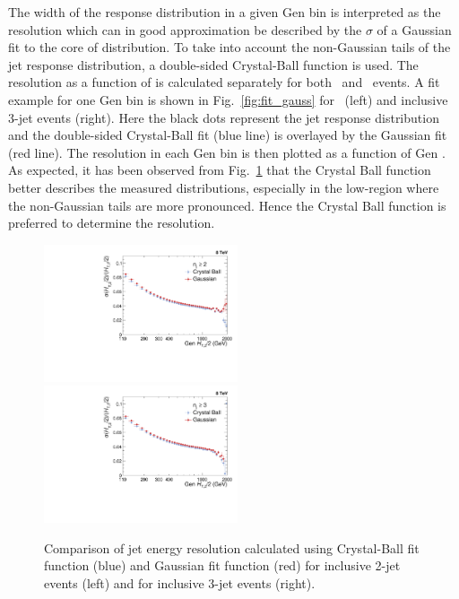 The width of the response distribution in a given Gen \httwo bin is interpreted as the resolution which can in good approximation be described by the $\sigma$ of a Gaussian fit to the core of distribution. To take into account the non-Gaussian tails of the jet response distribution, a double-sided Crystal-Ball function is used. The resolution as a function of \httwo is calculated separately for both \njt~and \njth~events. A fit example for one Gen \httwo bin is shown in Fig.~\ref{fig:fit_gauss} for \njt~(left) and inclusive 3-jet events (right). Here the black dots represent the jet response distribution and the double-sided Crystal-Ball fit (blue line) is overlayed by the Gaussian fit (red line). The resolution in each Gen \httwo bin is then plotted as a function of Gen \httwo. As expected, it has been observed from Fig.~\ref{fig:res_comp} that the Crystal Ball function better describes the measured distributions, especially in the low-\httwo region where the non-Gaussian tails are more pronounced. Hence the Crystal Ball function is preferred to determine the resolution.

\begin{figure}[h]
 \begin{center}
 \includegraphics[width=0.51\textwidth]{Plots_HT_2_150/Comparison_Resolution_Crystal_Gauss_2.pdf}%
 ~~\includegraphics[width=0.51\textwidth]{Plots_HT_2_150/Comparison_Resolution_Crystal_Gauss_3.pdf}
 \caption{Comparison of jet energy resolution calculated using Crystal-Ball fit function (blue) and Gaussian fit function (red) for inclusive 2-jet events (left) and for inclusive 3-jet events (right).}
 \label{fig:res_comp}
  \end{center}
\end{figure}

